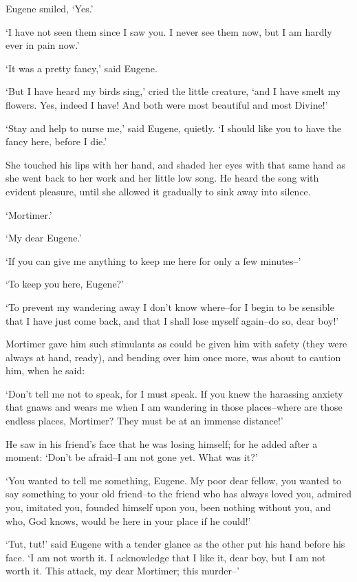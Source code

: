 Eugene smiled, ‘Yes.’

‘I have not seen them since I saw you. I never see them now, but I am
hardly ever in pain now.’

‘It was a pretty fancy,’ said Eugene.

‘But I have heard my birds sing,’ cried the little creature, ‘and I have
smelt my flowers. Yes, indeed I have! And both were most beautiful and
most Divine!’

‘Stay and help to nurse me,’ said Eugene, quietly. ‘I should like you to
have the fancy here, before I die.’

She touched his lips with her hand, and shaded her eyes with that same
hand as she went back to her work and her little low song. He heard the
song with evident pleasure, until she allowed it gradually to sink away
into silence.

‘Mortimer.’

‘My dear Eugene.’

‘If you can give me anything to keep me here for only a few minutes--’

‘To keep you here, Eugene?’

‘To prevent my wandering away I don’t know where--for I begin to be
sensible that I have just come back, and that I shall lose myself
again--do so, dear boy!’

Mortimer gave him such stimulants as could be given him with safety
(they were always at hand, ready), and bending over him once more, was
about to caution him, when he said:

‘Don’t tell me not to speak, for I must speak. If you knew the
harassing anxiety that gnaws and wears me when I am wandering in those
places--where are those endless places, Mortimer? They must be at an
immense distance!’

He saw in his friend’s face that he was losing himself; for he added
after a moment: ‘Don’t be afraid--I am not gone yet. What was it?’

‘You wanted to tell me something, Eugene. My poor dear fellow, you
wanted to say something to your old friend--to the friend who has always
loved you, admired you, imitated you, founded himself upon you, been
nothing without you, and who, God knows, would be here in your place if
he could!’

‘Tut, tut!’ said Eugene with a tender glance as the other put his hand
before his face. ‘I am not worth it. I acknowledge that I like it,
dear boy, but I am not worth it. This attack, my dear Mortimer; this
murder--’

